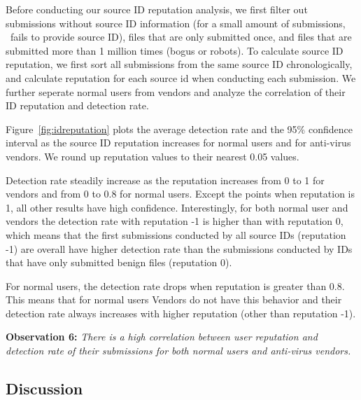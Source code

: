 Before conducting our source ID reputation analysis, we first filter out submissions without source ID information (for a small amount of submissions, \vt\ fails to provide source ID),
files that are only submitted once, and files that are submitted more than 1 million times (bogus or robots).
To calculate source ID reputation, we first sort all submissions from the same source ID chronologically, 
and calculate reputation for each source id when conducting each submission. 
We further seperate normal users from vendors and analyze the correlation of their ID reputation and detection rate.

Figure~\ref{fig:idreputation} plots the average detection rate and the 95\% confidence interval 
as the source ID reputation increases for normal users and for anti-virus vendors.
We round up reputation values to their nearest 0.05 values. 

Detection rate steadily increase as the reputation increases from 0 to 1 for vendors and from 0 to 0.8 for normal users.
Except the points when reputation is 1, all other results have high confidence.
Interestingly, for both normal user and vendors the detection rate with reputation -1 is higher than with reputation 0,
which means that the first submissions conducted by all source IDs (reputation -1) 
are overall have higher detection rate than 
the submissions conducted by IDs that have only submitted benign files (reputation 0).

For normal users, the detection rate drops when reputation is greater than 0.8.
This means that for normal users  %
Vendors do not have this behavior and their detection rate always increases with higher reputation (other than reputation -1).


{\bf Observation 6:} 
{\em There is a high correlation between user reputation and detection rate of their submissions for both normal users and anti-virus vendors.}


\subsection{Discussion}

